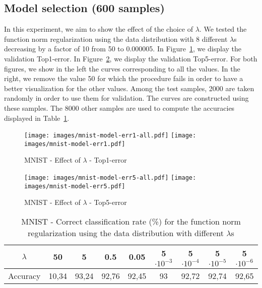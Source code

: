 \documentclass{article}
\begin{document}
\subsection{Model selection (600 samples)}
In this experiment, we aim to show the effect of the choice of $\lambda$. We tested the function norm regularization using the data distribution with 8 different $\lambda$s decreasing by a factor of 10 from 50 to 0.000005. In Figure~\ref{lambda-e1}, we display the validation Top1-error. In Figure~\ref{lambda-e5}, we display the validation Top5-error. For both figures, we show in the left the curves corresponding to all the values. In the right, we remove the value 50 for which the procedure fails in order to have a better visualization for the other values. Among the test samples, 2000 are taken randomly in order to use them for validation. The curves are constructed using these samples. The 8000 other samples are used to compute the accuracies displayed in Table~\ref{acc-model}.
\begin{figure}[ht!]
\texttt{[image: images/mnist-model-err1-all.pdf]}\hfill
\texttt{[image: images/mnist-model-err1.pdf]}
\caption{MNIST - Effect of $\lambda$ - Top1-error}
\label{lambda-e1}
\end{figure}

\begin{figure}[ht!]
\texttt{[image: images/mnist-model-err5-all.pdf]} \hfill
\texttt{[image: images/mnist-model-err5.pdf]}
\caption{MNIST - Effect of $\lambda$ - Top5-error}
\label{lambda-e5}
\end{figure}

\begin{table}[ht!]
\centering
\begin{tabular}{|c||c|c|c|c|c|c|c|c|}
\hline
$\lambda$ & 50 & 5 & 0.5 & 0.05& 5$\cdot 10^{-3}$& 5$\cdot 10^{-4}$& 5$\cdot 10^{-5}$ & 5$\cdot 10^{-6}$\\
\hline
Accuracy & 10,34 &	93,24 &	92,76&	92,45&	93&	92,72&	92,74&	92,65\\
\hline

\end{tabular}
\caption{MNIST - Correct classification rate (\%) for the function norm regularization using the data distribution with different $\lambda$s}
\label{acc-model}
\end{table}
\end{document}
